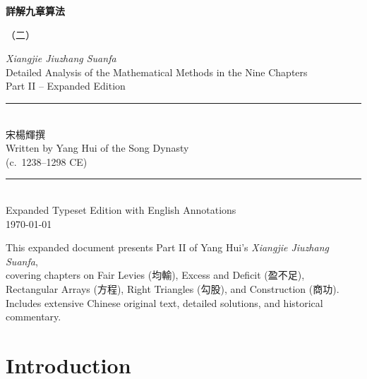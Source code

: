 \documentclass[11pt,a4paper]{article}
\newcommand{\longline}{\noindent\rule{\textwidth}{0.4pt}}
\newcommand{\zh}[1]{{#1}}
\begin{document}
\begin{titlepage}
\begin{center}

\vspace*{2cm}

{\Huge\bfseries\color{titlecolor}
\zh{詳解九章算法}\\[0.8cm]}

{\LARGE\color{sectioncolor}
\zh{（二）}\\[1.5cm]}

{\Large\color{sectioncolor}
\textit{Xiangjie Jiuzhang Suanfa}\\[0.3cm]}
{\large\color{sectioncolor}
Detailed Analysis of the Mathematical Methods in the Nine Chapters\\[0.5cm]
Part II -- Expanded Edition\\[2cm]}

\longline\\[1cm]

{\Large\zh{宋\quad 楊輝\quad 撰}}\\[0.5cm]
{\large Written by Yang Hui of the Song Dynasty}\\[0.3cm]
{\normalsize (c.\ 1238--1298 CE)}\\[2cm]

\longline\\[1.5cm]

{\large\color{notecolor}
Expanded Typeset Edition with English Annotations\\[0.5cm]
\today}

\vfill

{\small This expanded document presents Part II of Yang Hui's \textit{Xiangjie Jiuzhang Suanfa},\\
covering chapters on Fair Levies (\zh{均輸}), Excess and Deficit (\zh{盈不足}),\\
Rectangular Arrays (\zh{方程}), Right Triangles (\zh{勾股}), and Construction (\zh{商功}).\\
Includes extensive Chinese original text, detailed solutions, and historical commentary.}

\end{center}
\end{titlepage}

\tableofcontents
\newpage

\section*{Introduction}
\end{document}
